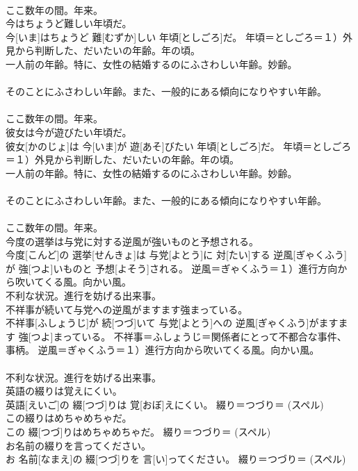 \documentclass[8pt]{extreport}
\begin{document}
\begin{CJK}{UTF8}{min}
{\\	ここ数年の間。年来。
\\	今はちょうど難しい年頃だ。	
\\	今[いま]はちょうど 難[むずか]しい 年頃[としごろ]だ。	年頃＝としごろ＝１）外見から判断した、だいたいの年齢。年の頃。 　　　　　　　　
\\	一人前の年齢。特に、女性の結婚するのにふさわしい年齢。妙齢。 　　　　　　　　
\\	そのことにふさわしい年齢。また、一般的にある傾向になりやすい年齢。 　　　　　　　　
\\	ここ数年の間。年来。
\\	彼女は今が遊びたい年頃だ。	
\\	彼女[かのじょ]は 今[いま]が 遊[あそ]びたい 年頃[としごろ]だ。	年頃＝としごろ＝１）外見から判断した、だいたいの年齢。年の頃。 　　　　　　　　
\\	一人前の年齢。特に、女性の結婚するのにふさわしい年齢。妙齢。 　　　　　　　　
\\	そのことにふさわしい年齢。また、一般的にある傾向になりやすい年齢。 　　　　　　　　
\\	ここ数年の間。年来。
\\	今度の選挙は与党に対する逆風が強いものと予想される。	
\\	今度[こんど]の 選挙[せんきょ]は 与党[よとう]に 対[たい]する 逆風[ぎゃくふう]が 強[つよ]いものと 予想[よそう]される。	逆風＝ぎゃくふう＝１）進行方向から吹いてくる風。向かい風。 　　　　　　　　　
\\	不利な状況。進行を妨げる出来事。
\\	不祥事が続いて与党への逆風がますます強まっている。	
\\	不祥事[ふしょうじ]が 続[つづ]いて 与党[よとう]への 逆風[ぎゃくふう]がますます 強[つよ]まっている。	不祥事＝ふしょうじ＝関係者にとって不都合な事件、事柄。 逆風＝ぎゃくふう＝１）進行方向から吹いてくる風。向かい風。 　　　　　　　　　
\\	不利な状況。進行を妨げる出来事。
\\	英語の綴りは覚えにくい。	
\\	英語[えいご]の 綴[つづ]りは 覚[おぼ]えにくい。	綴り＝つづり＝ (スペル) 
\\	この綴りはめちゃめちゃだ。	
\\	この 綴[つづ]りはめちゃめちゃだ。	綴り＝つづり＝ (スペル) 
\\	お名前の綴りを言ってください。	
\\	お 名前[なまえ]の 綴[つづ]りを 言[い]ってください。	綴り＝つづり＝ (スペル) 
}
\end{CJK}
\end{document}
